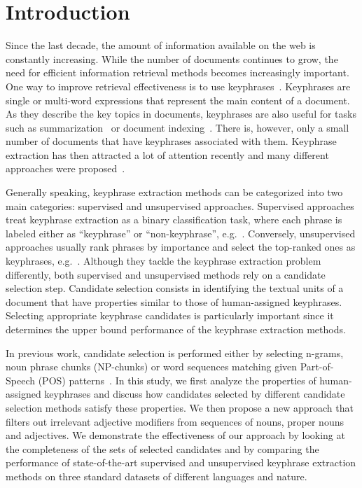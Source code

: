 \section{Introduction}
\label{sec:section}

  Since the last decade, the amount of information available on the web is
  constantly increasing. While the number of documents continues to grow, the
  need for efficient information retrieval methods becomes increasingly
  important. One way to improve retrieval effectiveness is to use
  keyphrases~\cite{jones1999phrasier}. Keyphrases are single or multi-word
  expressions that represent the main content of a document. As they describe
  the key topics in documents, keyphrases are also useful for tasks such as
  summarization~\cite{avanzo2005keyphrase} or document
  indexing~\cite{medelyan2008smalltrainingset}. There is, however, only a small
  number of documents that have keyphrases associated with them. Keyphrase
  extraction has then attracted a lot of attention recently and many different
  approaches were proposed~\cite{hasan2014state_of_the_art}.

  Generally speaking, keyphrase extraction methods can be categorized into two
  main categories: supervised and unsupervised approaches. Supervised approaches
  treat keyphrase extraction as a binary classification task, where each phrase
  is labeled either as ``keyphrase'' or ``non-keyphrase'',
  e.g.~\cite{witten1999kea}. Conversely, unsupervised approaches usually rank
  phrases by importance and select the top-ranked ones as keyphrases,
  e.g.~\cite{mihalcea2004textrank}. Although they tackle the keyphrase
  extraction problem differently, both supervised and unsupervised methods rely
  on a candidate selection step. Candidate selection consists in identifying the
  textual units of a document that have properties similar to those of
  human-assigned keyphrases. Selecting appropriate keyphrase candidates is
  particularly important since it determines the upper bound performance of the
  keyphrase extraction methods.

  In previous work, candidate selection is performed either by selecting
  n-grams, noun phrase chunks (NP-chunks) or word sequences matching given
  Part-of-Speech (POS) patterns~\cite{hulth2003keywordextraction}. In this
  study, we first analyze the properties of human-assigned keyphrases and
  discuss how candidates selected by different candidate selection methods
  satisfy these properties. We then propose a new approach that filters out
  irrelevant adjective modifiers from sequences of nouns, proper nouns and
  adjectives. We demonstrate the effectiveness of our approach by looking at the
  completeness of the sets of selected candidates and by comparing the
  performance of state-of-the-art supervised and unsupervised keyphrase
  extraction methods on three standard datasets of different languages and
  nature.

